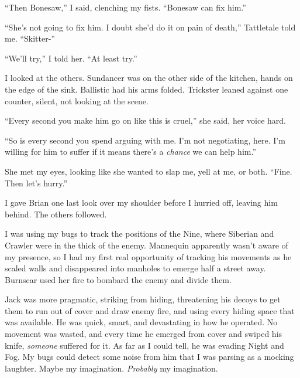 ``Then Bonesaw,'' I said, clenching my fists.  ``Bonesaw can fix him.''



``She's not going to fix him.  I doubt she'd do it on pain of death,'' Tattletale told me.  ``Skitter-''



``We'll try,'' I told her.  ``At least try.''



I looked at the others.  Sundancer was on the other side of the kitchen, hands on the edge of the sink.  Ballistic had his arms folded.  Trickster leaned against one counter, silent, not looking at the scene.



``Every second you make him go on like this is cruel,'' she said, her voice hard.



``So is every second you spend arguing with me.  I'm not negotiating, here.  I'm willing for him to suffer if it means there's a \emph{chance }we can help him.''



She met my eyes, looking like she wanted to slap me, yell at me, or both.  ``Fine.  Then let's hurry.''



I gave Brian one last look over my shoulder before I hurried off, leaving him behind.  The others followed.



I was using my bugs to track the positions of the Nine, where Siberian and Crawler were in the thick of the enemy.  Mannequin apparently wasn't aware of my presence, so I had my first real opportunity of tracking his movements as he scaled walls and disappeared into manholes to emerge half a street away.  Burnscar used her fire to bombard the enemy and divide them.



Jack was more pragmatic, striking from hiding, threatening his decoys to get them to run out of cover and draw enemy fire, and using every hiding space that was available.  He was quick, smart, and devastating in how he operated.  No movement was wasted, and every time he emerged from cover and swiped his knife, \emph{someone }suffered for it.  As far as I could tell, he was evading Night and Fog.  My bugs could detect some noise from him that I was parsing as a mocking laughter.  Maybe my imagination.  \emph{Probably} my imagination.



